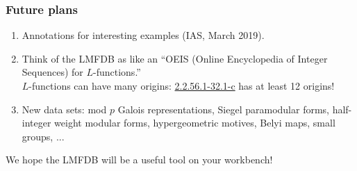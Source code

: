 \documentclass[xcolor=dvipsnames]{beamer}
\theoremstyle{plain}
\begin{document}
\begin{frame}[plain]
\frametitle{Future plans} \pause

\begin{enumerate}
\item Annotations for interesting examples (IAS, March 2019). \pause
\item Think of the LMFDB as like an ``OEIS (Online Encyclopedia of Integer Sequences) for $L$-functions.''  \pause \\
$L$-functions can have many origins: \href{http://cmfs.lmfdb.xyz/L/EllipticCurve/2.2.56.1/32.1/c/}{2.2.56.1-32.1-c} has at least 12 origins! \pause
\item New data sets: mod $p$ Galois representations, Siegel paramodular forms, half-integer weight modular forms, hypergeometric motives, Belyi maps, small groups, ... \pause
\end{enumerate}

We hope the LMFDB will be a useful tool on your workbench!
\end{frame}
\end{document}
